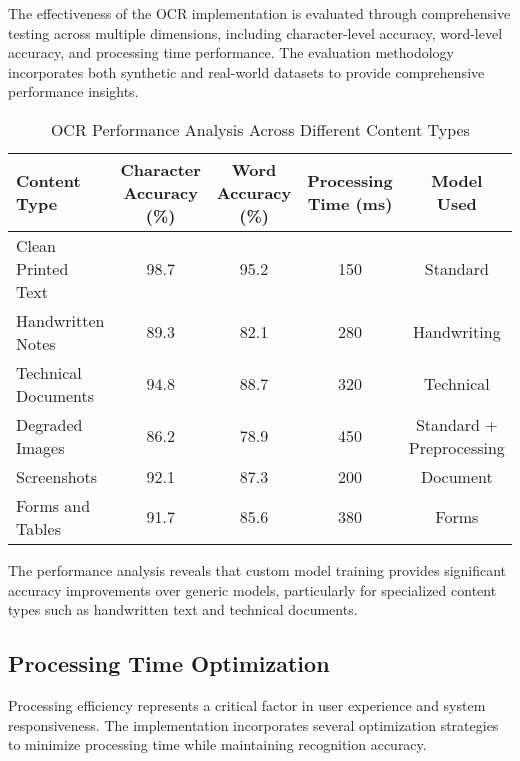 \begin{table}[H]
\begin{table}[H]
The effectiveness of the OCR implementation is evaluated through comprehensive testing across multiple dimensions, including character-level accuracy, word-level accuracy, and processing time performance. The evaluation methodology incorporates both synthetic and real-world datasets to provide comprehensive performance insights.

\begin{table}[H]
\centering
\caption{OCR Performance Analysis Across Different Content Types}
\label{tab:ocr_performance}
\begin{tabular}{|l|c|c|c|c|}
\hline
\textbf{Content Type} & \textbf{Character Accuracy (\%)} & \textbf{Word Accuracy (\%)} & \textbf{Processing Time (ms)} & \textbf{Model Used} \\
\hline
Clean Printed Text & 98.7 & 95.2 & 150 & Standard \\
\hline
Handwritten Notes & 89.3 & 82.1 & 280 & Handwriting \\
\hline
Technical Documents & 94.8 & 88.7 & 320 & Technical \\
\hline
Degraded Images & 86.2 & 78.9 & 450 & Standard + Preprocessing \\
\hline
Screenshots & 92.1 & 87.3 & 200 & Document \\
\hline
Forms and Tables & 91.7 & 85.6 & 380 & Forms \\
\hline
\end{tabular}
\end{table}

The performance analysis reveals that custom model training provides significant accuracy improvements over generic models, particularly for specialized content types such as handwritten text and technical documents.

\subsection{Processing Time Optimization}

Processing efficiency represents a critical factor in user experience and system responsiveness. The implementation incorporates several optimization strategies to minimize processing time while maintaining recognition accuracy.

\begin{figure}[H]
    \centering
\end{figure}
\end{table}
\end{table}
